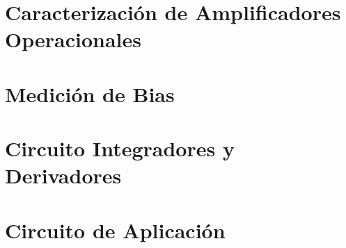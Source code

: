 








\tableofcontents
\newpage


\section{Caracterización de Amplificadores Operacionales}
	
\newpage	
\section{Medición de Bias}
    
\newpage
\section{Circuito Integradores y Derivadores}
    
    \newpage
\section{Circuito de Aplicación}
    




